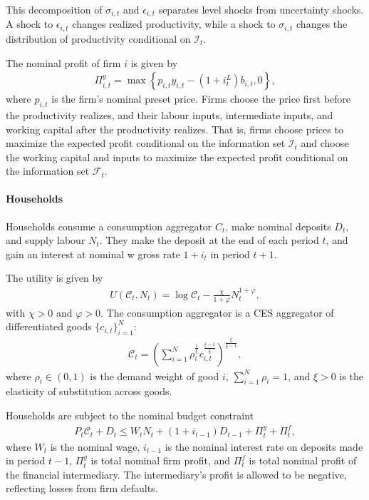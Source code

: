 \documentclass[12pt]{article}
\numberwithin{equation}{section}
\begin{document}
This decomposition of $\sigma_{i,t}$ and $\epsilon_{i,t}$ separates level shocks from uncertainty shocks. A shock to $\epsilon_{i,t}$ changes realized productivity, while a shock to $\sigma_{i,t}$ changes the distribution of productivity conditional on $\mathcal{I}_t$.

The nominal profit of firm $i$ is given by
\begin{align}\label{eq:firm_profit}
    \Pi^y_{i,t} = \max\left\{p_{i,t}y_{i,t} - (1+i^L_t)b_{i,t}, 0\right\},
\end{align}
where $p_{i,t}$ is the firm's nominal preset price. Firms choose the price first before the productivity realizes, and their labour inputs, intermediate inputs, and working capital after the productivity realizes. That is, firms choose prices to maximize the expected profit conditional on the information set $\mathcal{I}_t$ and choose the working capital and inputs to maximize the expected profit conditional on the information set $\mathcal{F}_t$.

\noindent \paragraph{Households} Households consume a consumption aggregator $C_t$, make nominal deposits $D_t$, and supply labour $N_t$. They make the deposit at the end of each period $t$, and gain an interest at nominal w gross rate $1 + i_t$ in period $t+1$. 

The utility is given by
\begin{align}\label{eq:hh_utility}
    U(\mathcal C_t,N_t)
    =
    \log \mathcal C_t
    -
    \frac{\chi}{1+\varphi}N_t^{1+\varphi},
\end{align}
with $\chi>0$ and $\varphi>0$. The consumption aggregator is a CES aggregator of differentiated goods $\{c_{i,t}\}_{i=1}^N$:
\begin{align*}
    \mathcal C_t
    =
    \left(
    \sum_{i=1}^N
    \rho_i^{\frac{1}{\xi}}
    c_{i,t}^{\frac{\xi-1}{\xi}}
    \right)^{\frac{\xi}{\xi-1}},
\end{align*}
where $\rho_i\in(0,1)$ is the demand weight of good $i$, $\sum_{i=1}^N\rho_i=1$, and $\xi>0$ is the elasticity of substitution across goods. 

Households are subject to the nominal budget constraint
\begin{align}\label{eq:hh_budget}
    P_t\mathcal C_t+D_t
    \leq
    W_tN_t
    +(1+i_{t-1})D_{t-1}
    +\Pi^y_t+\Pi^f_t,
\end{align}
where $W_t$ is the nominal wage, $i_{t-1}$ is the nominal interest rate on deposits made in period $t-1$, $\Pi^y_t$ is total nominal firm profit, and $\Pi^f_t$ is total nominal profit of the financial intermediary. The intermediary's profit is allowed to be negative, reflecting losses from firm defaults.
\end{document}
